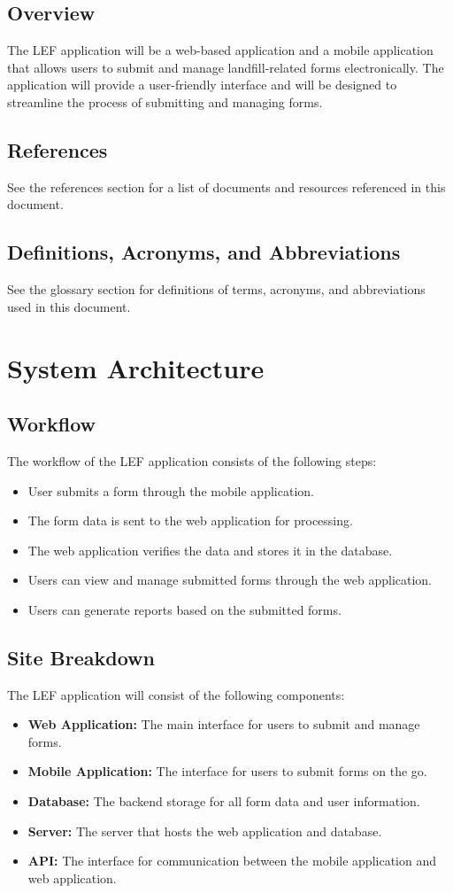 \documentclass[12pt]{article}
\begin{document}
\subsection{Overview}
The LEF application will be a web-based application and a mobile application that allows users to submit and manage landfill-related forms electronically. The application will provide a user-friendly interface and will be designed to streamline the process of submitting and managing forms.
\subsection{References}
See the references section for a list of documents and resources referenced in this document.
\subsection{Definitions, Acronyms, and Abbreviations}
See the glossary section for definitions of terms, acronyms, and abbreviations used in this document.
\newpage

\section{System Architecture}
\subsection{Workflow}
The workflow of the LEF application consists of the following steps:
\begin{itemize}
    \item User submits a form through the mobile application.
    \item The form data is sent to the web application for processing.
    \item The web application verifies the data and stores it in the database.
    \item Users can view and manage submitted forms through the web application.
    \item Users can generate reports based on the submitted forms.
\end{itemize}
\subsection{Site Breakdown}
The LEF application will consist of the following components:
\begin{itemize}
    \item \textbf{Web Application:} The main interface for users to submit and manage forms.
    \item \textbf{Mobile Application:} The interface for users to submit forms on the go.
    \item \textbf{Database:} The backend storage for all form data and user information.
    \item \textbf{Server:} The server that hosts the web application and database.
    \item \textbf{API:} The interface for communication between the mobile application and web application.
\end{itemize}
\newpage
\end{document}
